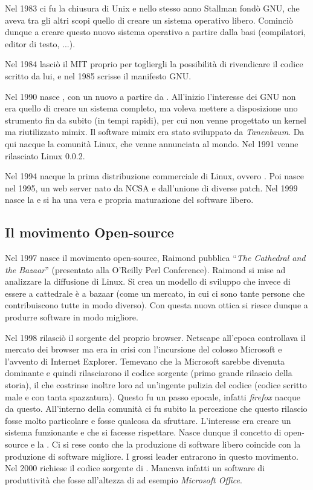 Nel 1983 ci fu la chiusura di Unix e nello stesso anno Stallman fondò GNU, che aveva tra gli altri scopi quello di creare un sistema operativo libero. Cominciò dunque a creare questo nuovo sistema operativo a partire dalla basi (compilatori, editor di testo, ...).

Nel 1984 lasciò il MIT proprio per togliergli la possibilità di rivendicare il codice scritto da lui, e nel 1985 scrisse il manifesto GNU.

Nel 1990 nasce , con un nuovo  a partire da . All'inizio l'interesse dei GNU non era quello di creare un sistema completo, ma voleva mettere a disposizione uno strumento fin da subito (in tempi rapidi), per cui non venne progettato un kernel ma riutilizzato mimix. Il software mimix era stato sviluppato da \textit{Tanenbaum}. Da qui nacque la comunità Linux, che venne annunciata al mondo. Nel 1991 venne rilasciato Linux 0.0.2.

Nel 1994 nacque la prima distribuzione commerciale di Linux, ovvero . Poi nasce  nel 1995, un web server nato da NCSA e dall'unione di diverse patch. Nel 1999 nasce la  e si ha una vera e propria maturazione del software libero.

\subsection{Il movimento Open-source}

Nel 1997 nasce il movimento open-source, Raimond pubblica ``\textit{The Cathedral and the Bazaar}'' (presentato alla O'Reilly Perl Conference). Raimond si mise ad analizzare la diffusione di Linux. Si crea un modello di sviluppo che invece di essere a cattedrale è a bazaar (come un mercato, in cui ci sono tante persone che contribuiscono tutte in modo diverso). Con questa nuova ottica si riesce dunque a produrre software in modo migliore.

Nel 1998  rilasciò il sorgente del proprio browser. Netscape all'epoca controllava il mercato dei browser ma era in crisi con l'incursione del colosso Microsoft e l'avvento di Internet Explorer. Temevano che la Microsoft sarebbe divenuta dominante e quindi rilasciarono il codice sorgente (primo grande rilascio della storia), il che costrinse inoltre loro ad un'ingente pulizia del codice (codice scritto male e con tanta spazzatura). Questo fu un passo epocale, infatti \textit{firefox} nacque da questo. All'interno della comunità ci fu subito la percezione che questo rilascio fosse molto particolare e fosse qualcosa da sfruttare. L'interesse era creare un sistema funzionante e che si facesse rispettare. Nasce dunque il concetto di open-source e la . Ci si rese conto che la produzione di software libero coincide con la produzione di software migliore. I grossi leader entrarono in questo movimento. Nel 2000  richiese il codice sorgente di . Mancava infatti un software di produttività che fosse all'altezza di ad esempio \textit{Microsoft Office}.

